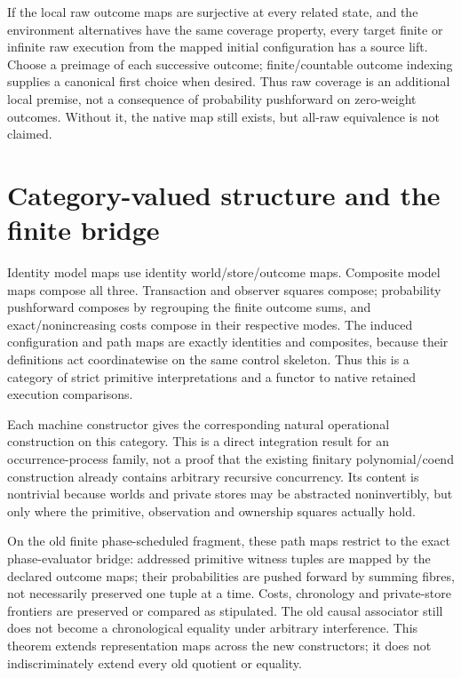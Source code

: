 \documentclass[11pt]{article}
\begin{document}
If the local raw outcome maps are surjective at every related state, and the environment alternatives have the same coverage property, every target finite or infinite raw execution from the mapped initial configuration has a source lift. Choose a preimage of each successive outcome; finite/countable outcome indexing supplies a canonical first choice when desired. Thus raw coverage is an additional local premise, not a consequence of probability pushforward on zero-weight outcomes. Without it, the native map still exists, but all-raw equivalence is not claimed.

\section{Category-valued structure and the finite bridge}
Identity model maps use identity world/store/outcome maps. Composite model maps compose all three. Transaction and observer squares compose; probability pushforward composes by regrouping the finite outcome sums, and exact/nonincreasing costs compose in their respective modes. The induced configuration and path maps are exactly identities and composites, because their definitions act coordinatewise on the same control skeleton. Thus this is a category of strict primitive interpretations and a functor to native retained execution comparisons.

Each machine constructor gives the corresponding natural operational construction on this category. This is a direct integration result for an occurrence-process family, not a proof that the existing finitary polynomial/coend construction already contains arbitrary recursive concurrency. Its content is nontrivial because worlds and private stores may be abstracted noninvertibly, but only where the primitive, observation and ownership squares actually hold.

On the old finite phase-scheduled fragment, these path maps restrict to the exact phase-evaluator bridge: addressed primitive witness tuples are mapped by the declared outcome maps; their probabilities are pushed forward by summing fibres, not necessarily preserved one tuple at a time. Costs, chronology and private-store frontiers are preserved or compared as stipulated. The old causal associator still does not become a chronological equality under arbitrary interference. This theorem extends representation maps across the new constructors; it does not indiscriminately extend every old quotient or equality.
\end{document}
